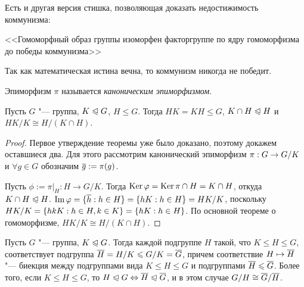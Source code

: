 \begin{note}
	Есть и другая версия стишка, позволяющая доказать недостижимость коммунизма:
	
	<<Гомоморфный образ группы изоморфен факторгруппе по ядру гомоморфизма до победы коммунизма>>
	
	Так как математическая истина вечна, то коммунизм никогда не победит.
\end{note}

\begin{note}
	Эпиморфизм $\pi$ называется \textit{каноническим эпиморфизмом}.
\end{note}

\begin{theorem}
	Пусть $G$ "--- группа, $K \trianglelefteqslant G$, $H \le G$. Тогда $HK = KH \le G$, $K \cap H \trianglelefteqslant H$ и $HK / K \cong H / (K \cap H)$.
\end{theorem}

\begin{proof}
	Первое утверждение теоремы уже было доказано, поэтому докажем оставшиеся два. Для этого рассмотрим канонический эпиморфизм $\pi: G \hm\to G / K$ и $\forall g \in G$ обозначим $\overline{g} := \pi(g)$.
	
	Пусть $\phi := \pi|_H : H \to G/ K$. Тогда $\operatorname{Ker} \varphi = \operatorname{Ker}\pi \cap H = K \cap H$, откуда $K \cap H \trianglelefteqslant H$. $\im \phi = \{\ol{h}: h \in H\} = \{hK: h \hm\in H\} = HK / K$, поскольку $HK / K \hm= \{hkK: h \in H, k \hm\in K\} = \{hK: h \in H\}$. По основной теореме о гомоморфизме, $HK / K \cong H / (K \cap H)$.
\end{proof}

\begin{theorem}
	Пусть $G$ "--- группа, $K \trianglelefteqslant G$. Тогда каждой подгруппе $H$ такой, что $K \le H \le G$, соответствует подгруппа $\ol{H} = H / K \hm\le G / K = \ol{G}$, причем соответствие $H \mapsto \overline{H}$ "--- биекция между подгруппами вида $K \le H \le G$ и подгруппами $\overline{H} \leqslant \overline{G}$. Более того, если $K \le H \le G$, то $H \trianglelefteqslant G \Leftrightarrow \overline{H} \trianglelefteqslant \overline{G}$, и в этом случае $G / H \cong \overline{G} / \overline{H}$.
\end{theorem}

